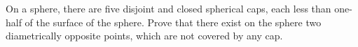 On a sphere, there are five disjoint and closed spherical caps, each less than one-half of the surface of the sphere. Prove that there exist on the sphere two diametrically opposite points, which are not covered by any cap.
